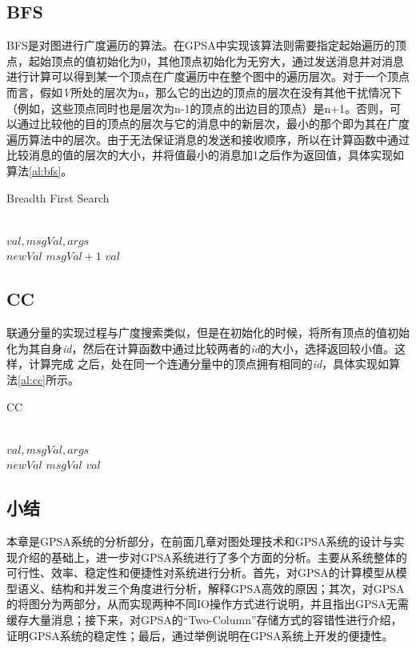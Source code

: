 \subsection{BFS}
BFS是对图进行广度遍历的算法。在GPSA中实现该算法则需要指定起始遍历的顶点，起始顶点的值初始化为0，其他顶点初始化为无穷大，通过发送消息并对消息进行计算可以得到某一个顶点在广度遍历中在整个图中的遍历层次。对于一个顶点而言，假如\textit{V}所处的层次为n，那么它的出边的顶点的层次在没有其他干扰情况下（例如，这些顶点同时也是层次为n-1的顶点的出边目的顶点）是n+1。否则，可以通过比较他的目的顶点的层次与它的消息中的新层次，最小的那个即为其在广度遍历算法中的层次。由于无法保证消息的发送和接收顺序，所以在计算函数中通过比较消息的值的层次的大小，并将值最小的消息加1之后作为返回值，具体实现如算法\ref{al:bfs}。
\begin{algorithm}
{
{
\renewcommand\baselinestretch{1.5}\selectfont %

\caption{Breadth First Search}
\label{al:bfs}
\begin{algorithmic}[1]
\REQUIRE ~\\
	$val,msgVal,args$
\ENSURE ~\\
	$newVal$
	 \RETURN $ msgVal + 1$
\ENDIF
\RETURN $val$

\end{algorithmic}
}
\par}
\end{algorithm}
\subsection{CC}
联通分量的实现过程与广度搜索类似，但是在初始化的时候，将所有顶点的值初始化为其自身\textit{id}，然后在计算函数中通过比较两者的\textit{id}的大小，选择返回较小值。这样，计算完成
之后，处在同一个连通分量中的顶点拥有相同的\textit{id}，具体实现如算法\ref{al:cc}所示。
\begin{algorithm}
{
{
\renewcommand\baselinestretch{1.5}\selectfont %

\caption{CC}
\label{al:cc}
\begin{algorithmic}[1]
\REQUIRE ~\\
	$val,msgVal,args$
\ENSURE ~\\
	$newVal$
	 \RETURN $ msgVal$
\ENDIF
\RETURN $val$

\end{algorithmic}
}
\par}
\end{algorithm}

\subsection{小结}


本章是GPSA系统的分析部分，在前面几章对图处理技术和GPSA系统的设计与实现介绍的基础上，进一步对GPSA系统进行了多个方面的分析。主要从系统整体的可行性、效率、稳定性和便捷性对系统进行分析。首先，对GPSA的计算模型从模型语义、结构和并发三个角度进行分析，解释GPSA高效的原因；其次，对GPSA的将图分为两部分，从而实现两种不同IO操作方式进行说明，并且指出GPSA无需缓存大量消息；接下来，对GPSA的“Two-Column”存储方式的容错性进行介绍，证明GPSA系统的稳定性；最后，通过举例说明在GPSA系统上开发的便捷性。



